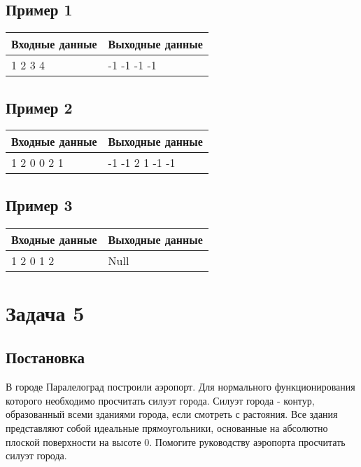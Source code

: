 \documentclass[a4]{article}
\begin{document}
\subsection*{Пример 1}
\label{sec:org25482f8}

\begin{table}[H]
\begin{center}
\begin{tabular}{|m{4cm}|m{4cm}|}
\hline
Входные данные & Выходные данные \\ \hline
1 2 3 4
&
-1 -1 -1 -1
\\ \hline
\end{tabular}
\end{center}
\end{table}
\subsection*{Пример 2}
\begin{table}[H]
\begin{center}
\begin{tabular}{|m{4cm}|m{4cm}|}
\hline
Входные данные & Выходные данные \\ \hline
1 2 0 0 2 1
&
-1 -1 2 1 -1 -1
\\ \hline
\end{tabular}
\end{center}
\end{table}
\subsection*{Пример 3}
\begin{table}[H]
\begin{center}
\begin{tabular}{|m{4cm}|m{4cm}|}
\hline
Входные данные & Выходные данные \\ \hline
1 2 0 1 2
&
Null
\\ \hline
\end{tabular}
\end{center}
\end{table}
\pagebreak

\section*{Задача 5}
\label{sec:orgb1f46a6}
\subsection*{Постановка}
\label{sec:orge854c50}
В городе Паралелоград построили аэропорт. Для нормального функционирования которого необходимо просчитать силуэт города. Силуэт города - контур, образованный всеми зданиями города, если смотреть с растояния. Все здания представляют собой идеальные прямоугольники, основанные на абсолютно плоской поверхности на высоте 0. Помогите руководству аэропорта просчитать силуэт города.
\end{document}
